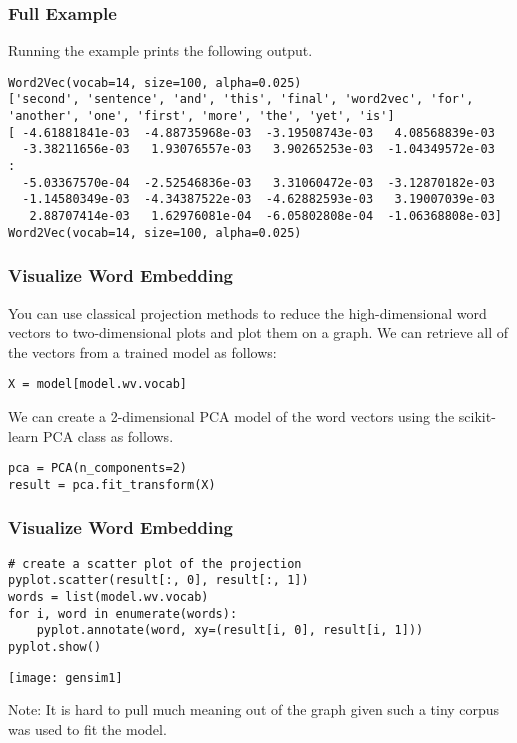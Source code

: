 \begin{frame}[fragile]\frametitle{Full Example }
Running the example prints the following output.


\begin{lstlisting}
Word2Vec(vocab=14, size=100, alpha=0.025)
['second', 'sentence', 'and', 'this', 'final', 'word2vec', 'for', 'another', 'one', 'first', 'more', 'the', 'yet', 'is']
[ -4.61881841e-03  -4.88735968e-03  -3.19508743e-03   4.08568839e-03
  -3.38211656e-03   1.93076557e-03   3.90265253e-03  -1.04349572e-03
:
  -5.03367570e-04  -2.52546836e-03   3.31060472e-03  -3.12870182e-03
  -1.14580349e-03  -4.34387522e-03  -4.62882593e-03   3.19007039e-03
   2.88707414e-03   1.62976081e-04  -6.05802808e-04  -1.06368808e-03]
Word2Vec(vocab=14, size=100, alpha=0.025)
\end{lstlisting}

\end{frame}

\begin{frame}[fragile]\frametitle{Visualize Word Embedding}
You can use classical projection methods to reduce the high-dimensional word vectors to two-dimensional plots and plot them on a graph. We can retrieve all of the vectors from a trained model as follows:

\begin{lstlisting}
X = model[model.wv.vocab]
\end{lstlisting}

We can create a 2-dimensional PCA model of the word vectors using the scikit-learn PCA class as follows.
\begin{lstlisting}
pca = PCA(n_components=2)
result = pca.fit_transform(X)
\end{lstlisting}

\end{frame}

\begin{frame}[fragile]\frametitle{Visualize Word Embedding}
\begin{lstlisting}
# create a scatter plot of the projection
pyplot.scatter(result[:, 0], result[:, 1])
words = list(model.wv.vocab)
for i, word in enumerate(words):
	pyplot.annotate(word, xy=(result[i, 0], result[i, 1]))
pyplot.show()
\end{lstlisting}

\begin{center}
\texttt{[image: gensim1]}
\end{center}

Note: It is hard to pull much meaning out of the graph given such a tiny corpus was used to fit the model.

\end{frame}


